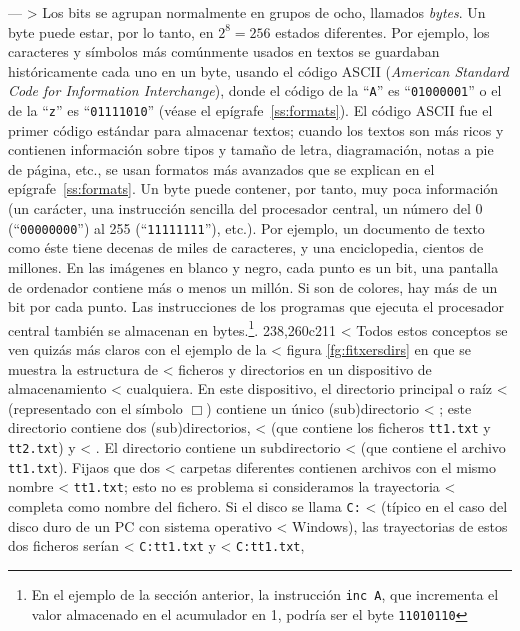 ---
> Los bits se agrupan normalmente en grupos de ocho, llamados \emph{bytes}. Un byte puede estar, por lo tanto, en $2^8=256$ estados diferentes. Por ejemplo, los caracteres y símbolos más comúnmente usados en textos se guardaban históricamente cada uno en un byte, usando el código ASCII\label{pg:ASCII} (\emph{American Standard Code for Information Interchange}), donde el código de la ``{\tt A}'' es ``{\tt 01000001}'' o el de la ``{\tt z}'' es ``{\tt 01111010}'' (véase el epígrafe~\ref{ss:formats}). El código ASCII fue el primer código estándar para almacenar textos; cuando los textos son más ricos y contienen información sobre tipos y tamaño de letra, diagramación, notas a pie de página, etc., se usan formatos más avanzados que se explican en el epígrafe~\ref{ss:formats}. Un byte puede contener, por tanto, muy poca información (un carácter, una instrucción sencilla del procesador central, un número del 0 (``{\tt 00000000}'') al 255 (``{\tt 11111111}''), etc.). Por ejemplo, un documento de texto como éste tiene decenas de miles de caracteres, y una enciclopedia, cientos de millones. En las imágenes en blanco y negro, cada punto es un bit, una pantalla de ordenador contiene más o menos un millón. Si son de colores, hay más de un bit por cada punto. Las instrucciones de los programas que ejecuta el procesador central también se almacenan en bytes.\footnote{En el ejemplo de la sección anterior, la instrucción {\tt inc A}, que incrementa el valor almacenado en el acumulador en 1, podría ser el byte {\tt 11010110}}. 
238,260c211
< Todos estos conceptos se ven quizás más claros con el ejemplo de la
< figura \ref{fg:fitxersdirs} en que se muestra la estructura de
< ficheros y directorios en un dispositivo de almacenamiento
< cualquiera. En este dispositivo, el directorio principal o raíz
< (representado con el símbolo $\Box$) contiene un único (sub)directorio
< ; este directorio contiene dos (sub)directorios, 
< (que contiene los ficheros \texttt{tt1.txt} y \texttt{tt2.txt}) y
< . El directorio  contiene un subdirectorio
<  (que contiene el archivo \texttt{tt1.txt}). Fijaos que dos
< carpetas diferentes contienen archivos con el mismo nombre
< \texttt{tt1.txt}; esto no es problema si consideramos la trayectoria
< completa como nombre del fichero. Si el disco se llama \texttt{C:}
< (típico en el caso del disco duro de un PC con sistema operativo
< Windows), las trayectorias de estos dos ficheros serían
< \texttt{C:}\barra{}\barra{}\barra\texttt{tt1.txt} y
< \texttt{C:}\barra{}\barra{}\barra{}\barra\texttt{tt1.txt},
